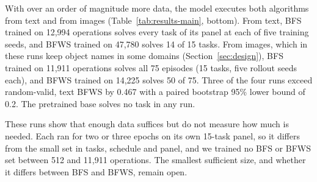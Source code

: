 With over an order of magnitude more data, the model executes both algorithms from text and from images (Table~\ref{tab:results-main}, bottom). From text, BFS trained on 12,994 operations solves every task of its panel at each of five training seeds, and BFWS trained on 47,780 solves 14 of 15 tasks. From images, which in these runs keep object names in some domains (Section~\ref{sec:design}), BFS trained on 11,911 operations solves all 75 episodes (15 tasks, five rollout seeds each), and BFWS trained on 14,225 solves 50 of 75. Three of the four runs exceed random-valid, text BFWS by 0.467 with a paired bootstrap 95\% lower bound of 0.2. The pretrained base solves no task in any run.

These runs show that enough data suffices but do not measure how much is needed. Each ran for two or three epochs on its own 15-task panel, so it differs from the small set in tasks, schedule and panel, and we trained no BFS or BFWS set between 512 and 11,911 operations. The smallest sufficient size, and whether it differs between BFS and BFWS, remain open.

